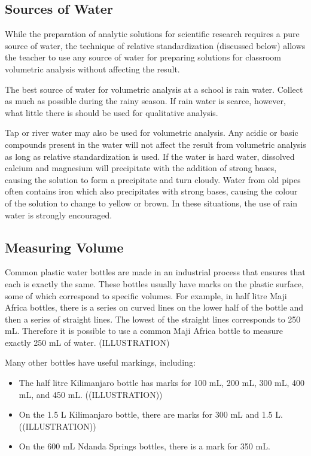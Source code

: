 \subsection{Sources of Water}
While the preparation of analytic solutions for scientific research requires a pure source of water, the technique of relative standardization (discussed below) allows the teacher to use any source of water for preparing solutions for classroom volumetric analysis without affecting the result.

The best source of water for volumetric analysis at a school is rain water. Collect as much as possible during the rainy season. If rain water is scarce, however, what little there is should be used for qualitative analysis.

Tap or river water may also be used for volumetric analysis. Any acidic or basic compounds present in the water will not affect the result from volumetric analysis as long as relative standardization is used. If the water is hard water, dissolved calcium and magnesium will precipitate with the addition of strong bases, causing the solution to form a precipitate and turn cloudy. Water from old pipes often contains iron which also precipitates with strong bases, causing the colour of the solution to change to yellow or brown. In these situations, the use of rain water is strongly encouraged.

\subsection{Measuring Volume}
Common plastic water bottles are made in an industrial process that ensures that each is exactly the same. These bottles usually have marks on the plastic surface, some of which correspond to specific volumes. For example, in half litre Maji Africa bottles, there is a series on curved lines on the lower half of the bottle and then a series of straight lines. The lowest of the straight lines corresponds to 250 mL. Therefore it is possible to use a common Maji Africa bottle to measure exactly 250 mL of water. (ILLUSTRATION)

Many other bottles have useful markings, including:
\begin{itemize}
\item{The half litre Kilimanjaro bottle has marks for 100 mL, 200 mL, 300 mL, 400 mL, and 450 mL. ((ILLUSTRATION))}
\item{On the 1.5 L Kilimanjaro bottle, there are marks for 300 mL and 1.5 L. ((ILLUSTRATION))}
\item{On the 600 mL Ndanda Springs bottles, there is a mark for 350 mL.}
\end{itemize}

